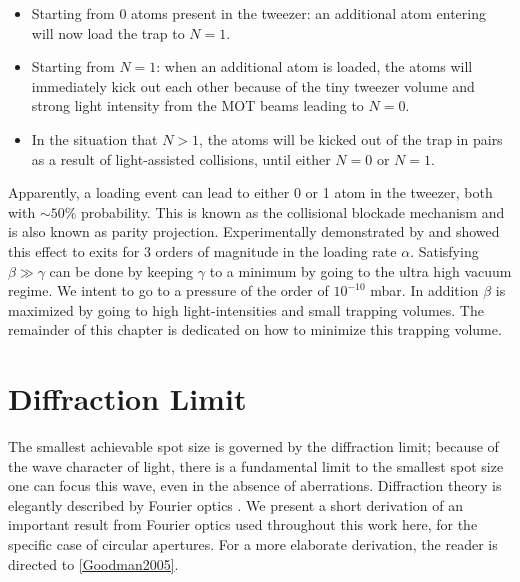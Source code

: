 \begin{itemize}
	\item Starting from 0 atoms present in the tweezer: an additional atom entering will now load the trap to $N=1$. 
	
	\item Starting from $N=1$: when an additional atom is loaded, the atoms will immediately kick out each other because of the tiny tweezer volume and strong light intensity from the MOT beams leading to $N=0$.
	
	\item In the situation that $N>1$, the atoms will be kicked out of the trap in pairs as a result of light-assisted collisions, until either $N=0$ or $N=1$.
\end{itemize}
Apparently, a loading event can lead to either 0 or 1 atom in the tweezer, both with $\sim 50\%$ probability. 
This is known as the collisional blockade mechanism and is also known as parity projection.
Experimentally demonstrated by \cite{Schlosser2001} and \cite{Schlosser2002} showed this effect to exits for 3 orders of magnitude in the loading rate $\alpha$.
Satisfying $\beta \gg \gamma$ can be done by keeping $\gamma$ to a minimum by going to the ultra high vacuum regime.
We intent to go to a pressure of the order of $10^{-10}$ mbar. In addition $\beta$ is maximized by going to high light-intensities and small trapping volumes. 
The remainder of this chapter is dedicated on how to minimize this trapping volume.

\section{Diffraction Limit}\label{sec:DiffractionLimit}

The smallest achievable spot size is governed by the diffraction limit; because of the wave character of light, there is a fundamental limit to the smallest spot size one can focus this wave, even in the absence of aberrations.
Diffraction theory is elegantly described by Fourier optics \cite{Goodman2005}. 
We present a short derivation of an important result from Fourier optics used throughout this work here, for the specific case of circular apertures.
For a more elaborate derivation, the reader is directed to \cref{Goodman2005}.

